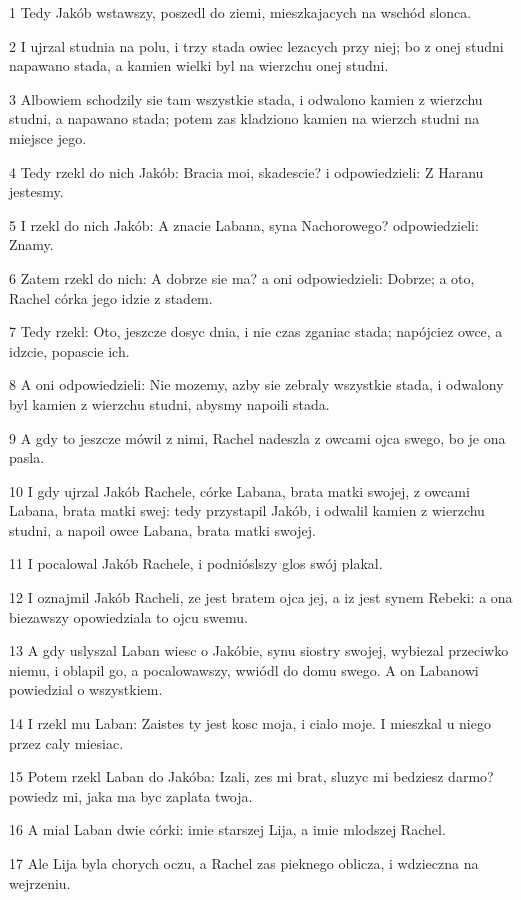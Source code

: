 \par 1 Tedy Jakób wstawszy, poszedl do ziemi, mieszkajacych na wschód slonca.
\par 2 I ujrzal studnia na polu, i trzy stada owiec lezacych przy niej; bo z onej studni napawano stada, a kamien wielki byl na wierzchu onej studni.
\par 3 Albowiem schodzily sie tam wszystkie stada, i odwalono kamien z wierzchu studni, a napawano stada; potem zas kladziono kamien na wierzch studni na miejsce jego.
\par 4 Tedy rzekl do nich Jakób: Bracia moi, skadescie? i odpowiedzieli: Z Haranu jestesmy.
\par 5 I rzekl do nich Jakób: A znacie Labana, syna Nachorowego? odpowiedzieli: Znamy.
\par 6 Zatem rzekl do nich: A dobrze sie ma? a oni odpowiedzieli: Dobrze; a oto, Rachel córka jego idzie z stadem.
\par 7 Tedy rzekl: Oto, jeszcze dosyc dnia, i nie czas zganiac stada; napójciez owce, a idzcie, popascie ich.
\par 8 A oni odpowiedzieli: Nie mozemy, azby sie zebraly wszystkie stada, i odwalony byl kamien z wierzchu studni, abysmy napoili stada.
\par 9 A gdy to jeszcze mówil z nimi, Rachel nadeszla z owcami ojca swego, bo je ona pasla.
\par 10 I gdy ujrzal Jakób Rachele, córke Labana, brata matki swojej, z owcami Labana, brata matki swej: tedy przystapil Jakób, i odwalil kamien z wierzchu studni, a napoil owce Labana, brata matki swojej.
\par 11 I pocalowal Jakób Rachele, i podnióslszy glos swój plakal.
\par 12 I oznajmil Jakób Racheli, ze jest bratem ojca jej, a iz jest synem Rebeki: a ona biezawszy opowiedziala to ojcu swemu.
\par 13 A gdy uslyszal Laban wiesc o Jakóbie, synu siostry swojej, wybiezal przeciwko niemu, i oblapil go, a pocalowawszy, wwiódl do domu swego. A on Labanowi powiedzial o wszystkiem.
\par 14 I rzekl mu Laban: Zaistes ty jest kosc moja, i cialo moje. I mieszkal u niego przez caly miesiac.
\par 15 Potem rzekl Laban do Jakóba: Izali, zes mi brat, sluzyc mi bedziesz darmo? powiedz mi, jaka ma byc zaplata twoja.
\par 16 A mial Laban dwie córki: imie starszej Lija, a imie mlodszej Rachel.
\par 17 Ale Lija byla chorych oczu, a Rachel zas pieknego oblicza, i wdzieczna na wejrzeniu.

